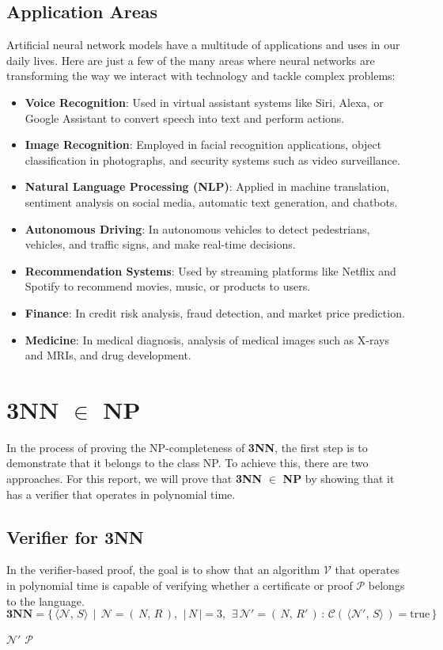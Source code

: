 \documentclass[../main]{subfiles}
\begin{document}
\subsection{Application Areas}
Artificial neural network models have a multitude of applications and uses in our daily lives. Here are just a few of the many areas where neural networks are transforming the way we interact with technology and tackle complex problems:
\begin{itemize}
\item[\textbullet] \textbf{Voice Recognition}: Used in virtual assistant systems like Siri, Alexa, or Google Assistant to convert speech into text and perform actions.
\item[\textbullet] \textbf{Image Recognition}: Employed in facial recognition applications, object classification in photographs, and security systems such as video surveillance.
\item[\textbullet] \textbf{Natural Language Processing (NLP)}: Applied in machine translation, sentiment analysis on social media, automatic text generation, and chatbots.
\item[\textbullet] \textbf{Autonomous Driving}: In autonomous vehicles to detect pedestrians, vehicles, and traffic signs, and make real-time decisions.
\item[\textbullet] \textbf{Recommendation Systems}: Used by streaming platforms like Netflix and Spotify to recommend movies, music, or products to users.
\item[\textbullet] \textbf{Finance}: In credit risk analysis, fraud detection, and market price prediction.
\item[\textbullet] \textbf{Medicine}: In medical diagnosis, analysis of medical images such as X-rays and MRIs, and drug development.
\end{itemize}
\section{3NN $\in$ NP}
In the process of proving the NP-completeness of \textbf{3NN}, the first step is to demonstrate that it belongs to the class NP. To achieve this, there are two approaches. For this report, we will prove that \textbf{3NN} $\in$ \textbf{NP} by showing that it has a verifier that operates in polynomial time.

\subsection{Verifier for 3NN}
In the verifier-based proof, the goal is to show that an algorithm $\mathcal{V}$ that operates in polynomial time is capable of verifying whether a certificate or proof $\mathcal{P}$ belongs to the language.
\begin{equation*}
    \textbf{3NN} = \{\, \langle \mathcal{N}, \, S \rangle \ \ | \ \  \mathcal{N} = (\, N, \, R \, ), \ \, | \, N \, | = 3, \ \, \exists \, \mathcal{N}' = (\, N, \, R' \, ) \, : \, \mathcal{C}(\, \langle \mathcal{N}', \, S \rangle \,) = \text{true} \, \}
\end{equation*}
\begin{center}
    $\mathcal{N}'$  $\mathcal{P}$
\end{center}
\end{document}
